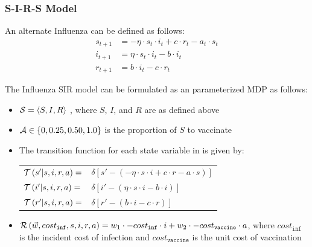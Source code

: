 \subsubsection{S-I-R-S Model}

An alternate Influenza can be defined as follows:
\begin{align*}
    s_{t + 1} &= -\eta \cdot s_t \cdot i_t + c \cdot r_t - a_t \cdot s_t \\
    i_{t + 1} &= \eta \cdot s_t \cdot i_t - b \cdot i_t \\
    r_{t+1} &= b \cdot i_t - c \cdot r_t 
\end{align*}

The Influenza SIR model can be formulated as an parameterized MDP as follows:
\begin{itemize}
    \item {\footnotesize $ \mathcal{S} = \left\langle S, I, R \right\rangle$ }, where $ S $, $ I $, and $ R $ are as defined above
    \item {\footnotesize $ \mathcal{A} \in \left\lbrace 0, 0.25, 0.50, 1.0 \right\rbrace $} is the proportion of $ S $ to vaccinate
    \item The transition function {\footnotesize \Transition} for each state variable in {\footnotesize \State} is given by:    
    {\footnotesize 
        \abovedisplayskip=5pt
        \belowdisplayskip=0pt
        \renewcommand{\arraystretch}{1.5}
        \begin{tabular}{ll}
            $ \mathcal{T}\left( s' | s, i, r, a \right) =$ & $ \delta \left[ s' - (- \eta \cdot s \cdot i + c \cdot r -a \cdot s) \right] $ \\
            $ \mathcal{T}\left( i' | s, i, r, a \right) =$ & $ \delta \left[ i' - (\eta \cdot s \cdot i - b \cdot i) \right] $ \\
            $ \mathcal{T}\left( r' | s, i, r, a \right) =$ & $ \delta \left[ r' - (b \cdot i - c \cdot r) \right] $ \\            
        \end{tabular}
    }%
    \item {\footnotesize $ \mathcal{R}\left(\vec{w}, cost_{\mathtt{inf}}, s, i, r, a \right) = w_1 \cdot -cost_{\mathtt{inf}} \cdot i + w_2 \cdot -cost_{\mathtt{vaccine}} \cdot a $}, where {\footnotesize $ cost_{\mathtt{inf}} $} is the incident cost of infection and {\footnotesize $ cost_{\mathtt{vaccine}} $} is the unit cost of vaccination \\
\end{itemize} 

